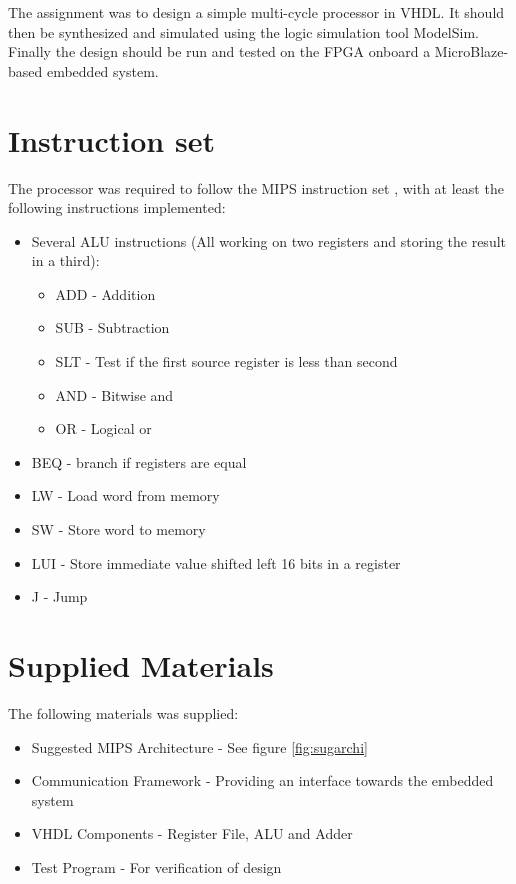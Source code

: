 The assignment was to design a simple multi-cycle processor in VHDL.
It should then be synthesized and simulated using the logic simulation tool ModelSim\cite{modelsim}.
Finally the design should be run and tested on the FPGA onboard a MicroBlaze-based embedded system.

\section{Instruction set}
\label{sec:instructionset}
The processor was required to follow the MIPS instruction set \cite{mips-ref}, with at least the following instructions implemented:
\begin{itemize}
    \item Several ALU instructions (All working on two registers and storing the result in a third):
        \begin{itemize}
            \item ADD - Addition
            \item SUB - Subtraction
            \item SLT - Test if the first source register is less than second
            \item AND - Bitwise and
            \item OR  - Logical or
        \end{itemize}
    \item BEQ - branch if registers are equal
    \item LW - Load word from memory
    \item SW - Store word to memory
    \item LUI - Store immediate value shifted left 16 bits in a register
    \item J - Jump
\end{itemize}

\section{Supplied Materials}
The following materials was supplied:
\begin{itemize}
    \item Suggested MIPS Architecture - See figure \ref{fig:sugarchi}
    \item Communication Framework - Providing an interface towards the embedded system
    \item VHDL Components - Register File, ALU and Adder
    \item Test Program - For verification of design
\end{itemize}

